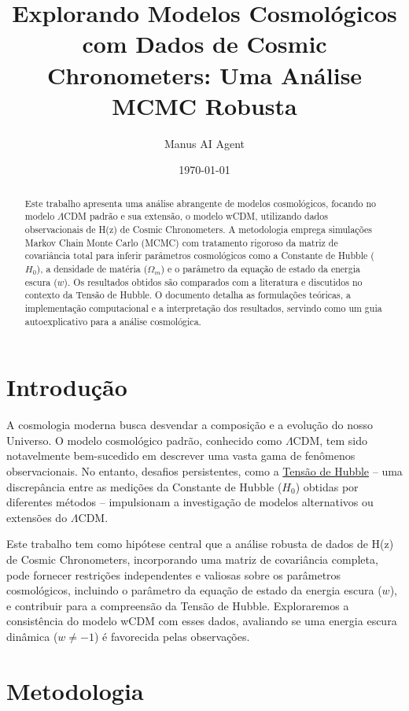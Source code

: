 \documentclass{article}
\title{Explorando Modelos Cosmológicos com Dados de Cosmic Chronometers: Uma Análise MCMC Robusta}
\author{Manus AI Agent}
\date{\today}
\begin{document}
\maketitle

\begin{abstract}
Este trabalho apresenta uma análise abrangente de modelos cosmológicos, focando no modelo $\Lambda$CDM padrão e sua extensão, o modelo wCDM, utilizando dados observacionais de H(z) de Cosmic Chronometers. A metodologia emprega simulações Markov Chain Monte Carlo (MCMC) com tratamento rigoroso da matriz de covariância total para inferir parâmetros cosmológicos como a Constante de Hubble ($H_0$), a densidade de matéria ($\Omega_m$) e o parâmetro da equação de estado da energia escura ($w$). Os resultados obtidos são comparados com a literatura e discutidos no contexto da Tensão de Hubble. O documento detalha as formulações teóricas, a implementação computacional e a interpretação dos resultados, servindo como um guia autoexplicativo para a análise cosmológica.
\end{abstract}

\section{Introdução}

A cosmologia moderna busca desvendar a composição e a evolução do nosso Universo. O modelo cosmológico padrão, conhecido como $\Lambda$CDM, tem sido notavelmente bem-sucedido em descrever uma vasta gama de fenômenos observacionais. No entanto, desafios persistentes, como a \href{https://en.wikipedia.org/wiki/Hubble_tension}{Tensão de Hubble} -- uma discrepância entre as medições da Constante de Hubble ($H_0$) obtidas por diferentes métodos -- impulsionam a investigação de modelos alternativos ou extensões do $\Lambda$CDM.

Este trabalho tem como hipótese central que a análise robusta de dados de H(z) de Cosmic Chronometers, incorporando uma matriz de covariância completa, pode fornecer restrições independentes e valiosas sobre os parâmetros cosmológicos, incluindo o parâmetro da equação de estado da energia escura ($w$), e contribuir para a compreensão da Tensão de Hubble. Exploraremos a consistência do modelo wCDM com esses dados, avaliando se uma energia escura dinâmica ($w \neq -1$) é favorecida pelas observações.

\section{Metodologia}
\end{document}
